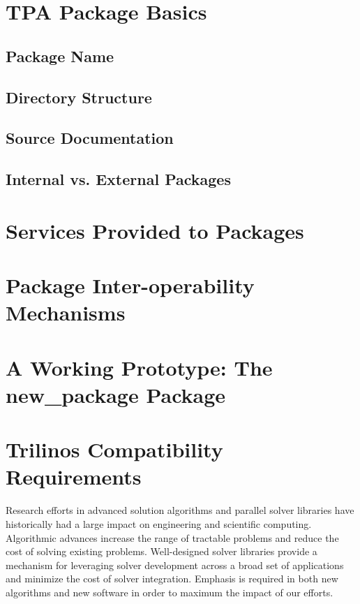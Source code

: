 \documentclass[12pt,relax]{TPA}
\begin{document}
\section{TPA Package Basics}

\subsection{Package Name}

\subsection{Directory Structure}

\subsection{Source Documentation}

\subsection{Internal vs. External Packages}

\section{Services Provided to Packages}

\section{Package Inter-operability Mechanisms}

\section{A Working Prototype: The new_package Package}

\section{Trilinos Compatibility Requirements}



Research efforts in advanced solution algorithms and parallel solver
libraries have historically had a large impact on engineering and
scientific computing.  Algorithmic advances increase the range
of tractable problems and reduce the cost of solving existing
problems.  Well-designed solver libraries provide a mechanism for
leveraging solver development across a broad set of applications and
minimize the cost of solver integration.  Emphasis is
required in both new algorithms and new software in order
to maximum the impact of our efforts.
\end{document}
